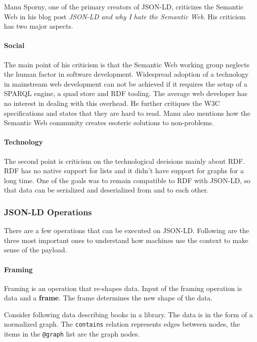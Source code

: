 Manu Sporny, one of the primary creators of JSON-LD, criticizes the Semantic Web in his blog post \textit{JSON-LD and why I hate the Semantic Web}. His criticism has two major aspects.

\paragraph{Social}
The main point of his criticism is that the Semantic Web working group neglects the human factor in software development. Widespread adoption of a technology in mainstream web development can not be achieved if it requires the setup of a \gls{SPARQL engine}, a \gls{quad store} and \gls{RDF} tooling. The average web developer has no interest in dealing with this overhead. He further critiques the W3C specifications and states that they are hard to read. \citep{semanticwebrevisited} Manu also mentions how the Semantic Web community creates esoteric solutions to non-problems. \citep{semanticwebrevisited}

\paragraph{Technology}
The second point is criticism on the technological decisions mainly about RDF. RDF has no native support for lists and it didn't have support for graphs for a long time. One of the goals was to remain compatible to RDF with JSON-LD, so that data can be serialized and deserialized from and to each other. \citep{semanticwebrevisited}

\subsubsection{JSON-LD Operations}
There are a few operations that can be executed on JSON-LD. Following are the three most important ones to understand how machines use the context to make sense of the payload.

\paragraph{Framing}
Framing is an operation that re-shapes data. Input of the framing operation is data and a \textbf{frame}. The frame determines the new shape of the data.

Consider following data describing books in a library. The data is in the form of a normalized graph. The \lstinline{contains} relation represents edges between nodes, the items in the \lstinline{@graph} list are the graph nodes.

